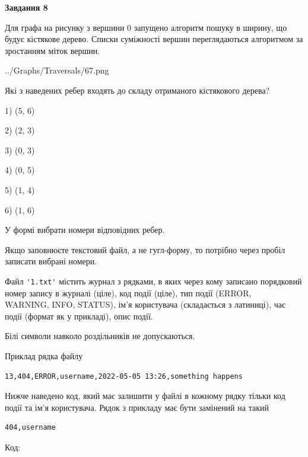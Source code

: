 \documentclass[12pt, ukrainian]{article}
\def\code#1{\Verb!#1!}
\begin{document}
{\begin {large}
{\begin {center}\textbf{Завдання 8}\end {center}}\par
Для графа на рисунку з вершини 0 запущено алгоритм пошуку в ширину, що будує кістякове дерево. Списки суміжності вершин переглядаються алгоритмом за зростанням міток вершин.\par
\begin{center}
	{../Graphs/Traversals/67.png}
\end{center}
\par Які з наведених ребер входять до складу отриманого кістякового дерева?\par
1) (5, 6)\par
2) (2, 3)\par
3) (0, 3)\par
4) (0, 5)\par
5) (1, 4)\par
6) (1, 6)\par
{\vskip 15pt} У формі вибрати номери відповідних ребер.


Якщо заповнюєте текстовий файл, а не гугл-форму, то потрібно через пробіл записа\-ти вибрані номери.\par
\newpage


Файл \code{'1.txt'} містить журнал з рядками, в яких через кому записано поряд\-ко\-вий номер запису в журналі (ціле), код події (ціле), тип події (ERROR, \\WARNING, INFO, STATUS), ім'я користувача (складається з латиниці), час події (фор\-мат як у прикладі), опис події.

Білі символи навколо роздільників не допускаються.

Приклад рядка файлу



\begin{verbatim}
13,404,ERROR,username,2022-05-05 13:26,something happens
\end{verbatim}


Нижче наведено код, який має залишити у файлі в кожному рядку тільки код події та ім'я користувача. Рядок з прикладу має бути замінений на такий



\begin{verbatim}
404,username
\end{verbatim}




Код:




\end{large}}
\end{document}

